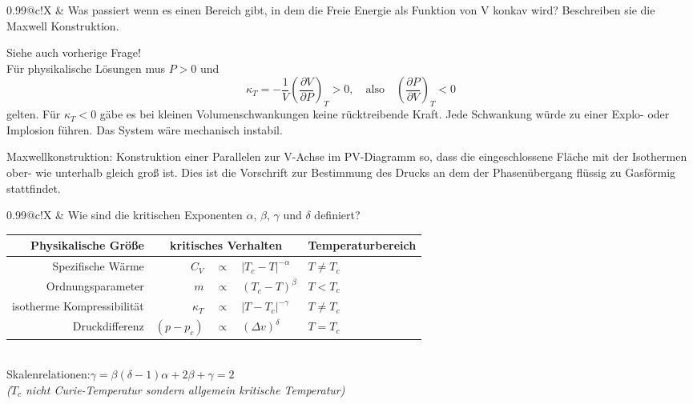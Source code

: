 \documentclass[a4paper,12pt]{scrartcl}
\makeatletter
\def\rpf#1#2{\ka{\frac{\partial #1}{\partial #2}}}	%
\def\ka#1{\left(#1\right)}				%
\newcounter{qc}\setcounter{qc}{1}
\newenvironment{fshaded}{
\def\FrameCommand{\fcolorbox{framecolor}{shadecolor}}
\MakeFramed {\FrameRestore}}
{\endMakeFramed}
\def\frage#1{
\begin{fshaded}
\noindent
\begin{tabularx}{0.99\textwidth}{@{}c!{\color{framecolor}\vline}X}
{ \bf \rm \theqc }	&	\noindent #1
\end{tabularx}
\stepcounter{qc}
\end{fshaded}
}
\makeatother
\begin{document}
\frage{Was passiert wenn es einen Bereich gibt, in dem die Freie Energie als Funktion von V konkav wird? Beschreiben sie die 
Maxwell Konstruktion.}
\noindent
Siehe auch vorherige Frage!\\
Für physikalische Lösungen mus $P>0$ und\\
\[\kappa_T=-\frac1V\rpf VP_T>0,\quad\text{also}\quad\rpf PV_T<0\]
gelten. Für $\kappa_T<0$ gäbe es bei kleinen Volumenschwankungen keine rücktreibende Kraft. Jede Schwankung würde zu einer 
Explo- oder Implosion führen. Das System wäre mechanisch instabil.

Maxwellkonstruktion: Konstruktion einer Parallelen zur V-Achse im PV-Diagramm so, dass die eingeschlossene Fläche mit der 
Isothermen ober- wie unterhalb gleich groß ist. Dies ist die Vorschrift zur Bestimmung des Drucks
an dem der Phasenübergang flüssig zu Gasförmig stattfindet.

\frage{Wie sind die kritischen Exponenten $\alpha$, $\beta$, $\gamma$ und $\delta$ definiert?}
\noindent
	\begin{tabularx}{\textwidth}{@{}r|rcl|l}
		\textbf{Physikalische Größe} & \multicolumn{3}{c|}{\textbf{kritisches Verhalten}}&\textbf{Temperaturbereich}\\
		\hline{}
		Spezifische Wärme&$C_V$&$\propto$&$|T_c-T|^{-\alpha}$&$T\neq T_c$\\
		Ordnungsparameter&$m$&$\propto$&$(T_c-T)^\beta$&$T< T_c$\\
		isotherme Kompressibilität&$\kappa_T$&$\propto$&$|T-T_c|^{-\gamma }$&$T\neq T_c$\\
		Druckdifferenz&$(p-p_c)$&$\propto$&$(\Delta v)^\delta$&$T = T_c$\\
	\end{tabularx}\\	
Skalenrelationen:\quad$\gamma=\beta(\delta-1)$\quad$\alpha+2\beta+\gamma=2$\\
{\it($T_c$ nicht Curie-Temperatur sondern allgemein kritische Temperatur)}
\end{document}
